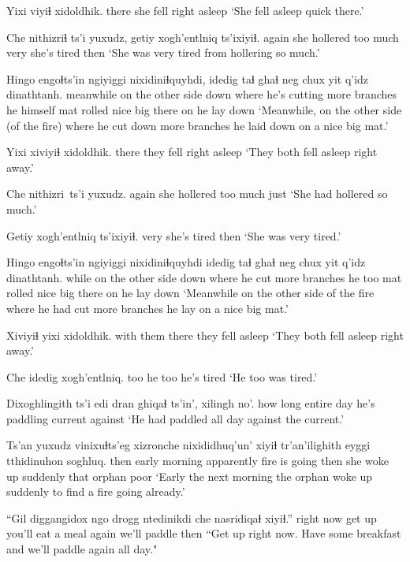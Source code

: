 \documentclass[12pt]{article}
\begin{document}
\gll Yixi  {viyiɬ xidoldhik.}
there {she fell right asleep }
\glt `She fell asleep quick there.'
\glend

\gll Che {nithizriɬ}         ts'i yuxudz, getiy xogh'entlniq ts'ixiyiɬ.
again {she hollered too much} {} {}    very  {she's tired   } then
\glt `She was very tired from hollering so much.'
\glend

\gll Hingo     engoɬts'in        ngiyiggi nixidiniɬquyhdi, idedig     taɬ ghaɬ   neg  chux yit   q'idz dinathtanh.
meanwhile {on the other side} down     {where he's cutting more branches} {he himself} mat rolled nice big there on   {he lay down}
\glt `Meanwhile, on the other side (of the fire) where he cut down more branches he laid down on a nice big mat.'
\glend

\gll Yixi {xiviyiɬ xidoldhik. }
there {they fell right asleep} 
\glt `They both fell asleep right away.'
\glend

\gll Che nithizri\ ts'i yuxudz.
again {she hollered too much} {} just
\glt  `She had hollered so much.'
\glend

\gll Getiy     xogh'entlniq ts'ixiyiɬ.
very {she's tired} then
\glt `She was very tired.'
\glend

\gll Hingo engoɬts'in ngiyiggi nixidiniɬquyhdi idedig taɬ ghaɬ neg chux yit q'idz dinathtanh.
while {on the other side} down {where he cut more branches} {he too} mat rolled nice big there on {he lay down}
\glt   `Meanwhile on the other side of the fire where he had cut more branches he lay on a nice big mat.'
\glend  

\gll Xiviyiɬ yixi xidoldhik. 
{with them} there {they fell asleep} 
\glt `They both fell asleep right away.'
\glend

\gll Che idedig xogh'entlniq.
too {he too} {he's tired}
\glt  `He too was tired.'
\glend

\gll Dixoghlingith ts'i edi dran     ghiqaɬ ts'in', xilingh no'.
{how long}    {} entire day  {he's paddling} {} current against
\glt `He had paddled all day against the current.'
\glend

\gll Ts'an yuxudz vinixuɬts'eg xizronche nixididhuq'un' xiyiɬ tr'an'ilighith       eyggi tthidinuhon soghluq.	
then  {}       {early morning} apparently  {fire is going}  then   {she woke up suddenly} that  orphan      poor
\glt `Early the next morning the orphan woke up suddenly to find a fire going already.'
\glend

\gll ``Gil       diggangidox ngo {drogg ntedinikdi}      che   nasridiqaɬ     xiyiɬ.''
{right now} {get up}  {}  {you'll eat a meal}    again {we'll paddle} then
\glt  ``Get up right now. Have some breakfast and we'll paddle again all day."
\glend
\end{document}
